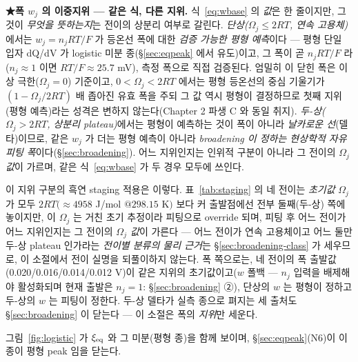 \textbf{★폭 $w_j$ 의 이중지위 --- 같은 식, 다른 지위.} 식~\eqref{eq:wbase} 의 \emph{값}은 한 줄이지만, 그것이
\emph{무엇을 뜻하는지}는 전이의 상분리 여부로 갈린다. \emph{단상($\Omega_j\le2RT$, 연속 고용체)}에서는 $w_j=n_jRT/F$
가 등온선 폭에 대한 \emph{검증 가능한 평형 예측}이다 --- 평형 단일 입자 dQ/dV 가 logistic
미분 종(\S\ref{sec:eqpeak} 에서 유도)이고, 그 폭이 곧 $n_jRT/F$ 라($n_j\!\approx\!1$ 이면 $RT/F\!\approx\!25.7$ mV), 측정 폭으로 직접 검증된다. 엄밀히 이 닫힌 폭은 이상 극한($\Omega_j=0$) 기준이고,
$0<\Omega_j<2RT$ 에서는 평형 등온선의 중심 기울기가 $(1-\Omega_j/2RT)$ 배 좁아진 유효 폭을 주되 그
값 역시 평형이 결정하므로 첫째 지위(평형 예측)라는 성격은 변하지 않는다(Chapter 2 파생 C 와 동일 취지).
\emph{두-상($\Omega_j>2RT$, 상분리 plateau)}에서는 평형이 예측하는 것이 폭이 아니라 \emph{날카로운 선}(델타)이므로,
같은 $w_j$ 가 더는 평형 예측이 아니라 \emph{broadening 이 정하는 현상학적 자유 피팅 폭}이다(\S\ref{sec:broadening}).
어느 지위인지는 인위적 구분이 아니라 그 전이의 \emph{$\Omega_j$ 값}이 가르며, 같은 식~\eqref{eq:wbase} 가 두 경우 모두에
쓰인다.

이 지위 구분의 흑연 staging 적용은 이렇다. 표~\ref{tab:staging} 의 네 전이는 \emph{초기값} $\Omega_j$ 가 모두 $2RT(\!\approx\!4958$ J/mol
$@298.15$ K$)$ 보다 커 출발점에선 전부 둘째(두-상) 쪽에 놓이지만, 이 $\Omega_j$ 는 거친 초기 추정이라 피팅으로
override 되며, 피팅 후 어느 전이가 어느 지위인지는 그 전이의 \emph{$\Omega_j$ 값}이 가른다 --- 어느 전이가
연속 고용체이고 어느 둘만 두-상 plateau 인가라는 \emph{전이별 분류의 물리 근거}는 \S\ref{sec:broadening-class} 가
세우므로, 이 소절에서 전이 실명을 되풀이하지 않는다. 폭 쪽으로는, 네 전이의 폭 출발값(0.020/0.016/0.014/0.012 V)이
같은 지위의 초기값이고($w$ 폴백 --- $n_j$ 입력을
배제해야 활성화되며 현재 출발은 $n_j{=}1$: \S\ref{sec:broadening} ②), 단상의 $w$ 는 평형이
정하고 두-상의 $w$ 는 피팅이 정한다. 두-상 델타가 실측 종으로 펴지는 세 출처도 \S\ref{sec:broadening} 이 닫는다 --- 이 소절은 폭의 \emph{지위}만 세운다.

그림~\ref{fig:logistic} 가 $\xi_{\mathrm{eq}}$ 와 그 미분(평형 종)을 함께 보이며, \S\ref{sec:eqpeak}(N6)이 이 종이 평형 peak 임을 닫는다.

